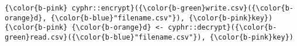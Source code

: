 \documentclass[class=minimal,border=0]{standalone}
\begin{document}
%
\begin{BVerbatim}[bgcolor=b-darkgrey]
{\color{b-pink} cyphr::encrypt}({\color{b-green}write.csv}({\color{b-orange}d}, {\color{b-blue}"filename.csv"}), {\color{b-pink}key})
{\color{b-pink} {\color{b-orange}d} <- cyphr::decrypt}({\color{b-green}read.csv}({\color{b-blue}"filename.csv"}), {\color{b-pink}key})
\end{BVerbatim}
\end{document}
